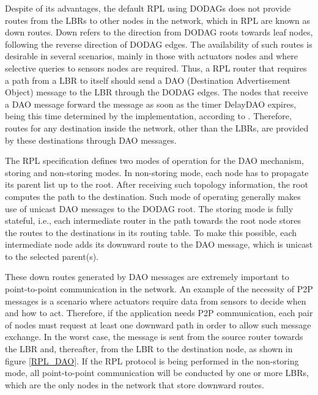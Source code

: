 \documentclass[final,authoryear,3p,twocolumn]{elsarticle}
\begin{document}
Despite of its advantages, the default RPL using DODAGs does not provide routes from the LBRs to other nodes in the network, which in RPL are known as down routes. Down refers to the direction from DODAG roots towards leaf nodes, following the reverse direction of DODAG edges. The availability of such routes is desirable in several scenarios, mainly in those with actuators nodes and where selective queries to sensors nodes are required. Thus, a RPL router that requires a path from a LBR to itself should send a DAO (Destination Advertisement Object) message to the LBR through the DODAG edges. The nodes that receive a DAO message forward the message as soon as the timer DelayDAO expires, being this time determined by the implementation, according to \citep{RFC6550}. Therefore, routes for any destination inside the network, other than the LBRs, are provided by these destinations through DAO messages.

The RPL specification defines two modes of operation for the DAO mechanism, storing and non-storing modes. In non-storing mode, each node has to propagate its parent list up to the root. After receiving such topology information, the root computes the path to the destination. Such mode of operating generally makes use of unicast DAO messages to the DODAG root. The storing mode is fully stateful, i.e., each intermediate router in the path towards the root node stores the routes to the destinations in its routing table. To make this possible, each intermediate node adds its downward route to the DAO message, which is unicast to the selected parent(s).

These down routes generated by DAO messages are extremely important to point-to-point communication in the network. An example of the necessity of P2P messages is a scenario where actuators require data from sensors to decide when and how to act. Therefore, if the application needs P2P communication, each pair of nodes must request at least one downward path in order to allow such message exchange. In the worst case, the message is sent from the source router towards the LBR and, thereafter, from the LBR to the destination node, as shown in figure \ref{RPL_DAO}. If the RPL protocol is being performed in the non-storing mode, all point-to-point communication will be conducted by one or more LBRs, which are the only nodes in the network that store downward routes.
\end{document}
